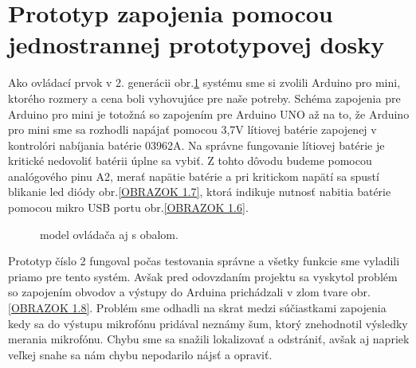 
\section{Prototyp zapojenia pomocou jednostrannej prototypovej dosky}

Ako ovládací prvok v 2. generácii obr.\ref{OBRAZOK 1.5} systému sme si zvolili Arduino pro mini, ktorého rozmery a cena boli vyhovujúce pre naše potreby. Schéma zapojenia pre Arduino pro mini je totožná so zapojením pre Arduino UNO až na to, že Arduino pro mini sme sa rozhodli napájať pomocou 3,7V lítiovej batérie zapojenej v kontrolóri nabíjania batérie 03962A. Na správne fungovanie lítiovej batérie je kritické nedovoliť batérii úplne sa vybiť. Z tohto dôvodu budeme pomocou analógového pinu A2, merať napätie batérie a pri kritickom napätí sa spustí blikanie led diódy obr.\ref{OBRAZOK 1.7}, ktorá indikuje nutnosť nabitia batérie pomocou mikro USB portu obr.\ref{OBRAZOK 1.6}.

\begin{figure}[!tbh]
\centering
{}
\caption{model ovládača aj s obalom.}\label{OBRAZOK 1.5}
\end{figure}

Prototyp číslo 2 fungoval počas testovania správne a všetky funkcie sme vyladili priamo pre tento systém. Avšak pred odovzdaním projektu sa vyskytol problém so zapojením obvodov a výstupy do Arduina prichádzali v zlom tvare obr.\ref{OBRAZOK 1.8}. Problém sme odhadli na skrat medzi súčiastkami zapojenia kedy sa do výstupu mikrofónu pridával neznámy šum, ktorý znehodnotil výsledky merania mikrofónu. Chybu sme sa snažili lokalizovať a odstrániť, avšak aj napriek veľkej snahe sa nám chybu nepodarilo nájsť a opraviť.

